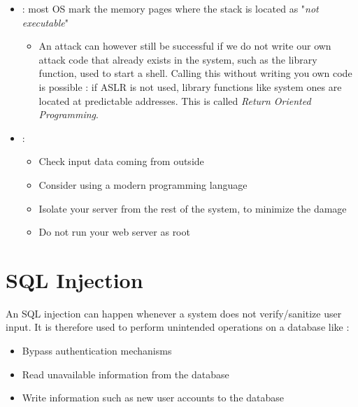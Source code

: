 \begin{itemize}
\begin{itemize}
        \end{itemize}
    \item {} : most OS mark the memory pages where the stack is located as "\textit{not executable}"
        \begin{itemize}
            \item An attack can however still be successful if we do not write our own attack code that already exists in the system, such as the  library function, used to start a shell. Calling this without writing you own code is possible : if ASLR is not used, library functions like system ones are located at predictable addresses. This is called \textit{Return Oriented Programming}.
        \end{itemize}
    \item {} : 
        \begin{itemize}
            \item Check input data coming from outside
            \item Consider using a modern programming language
            \item Isolate your server from the rest of the system, to minimize the damage
            \item Do not run your web server as root
        \end{itemize}
\end{itemize}

\chapter{SQL Injection}

An SQL injection can happen whenever a system does not verify/sanitize user input. It is therefore used to perform unintended operations on a database like :
\begin{itemize}
    \item Bypass authentication mechanisms
    \item Read unavailable information from the database
    \item Write information such as new user accounts to the database
\end{itemize}

